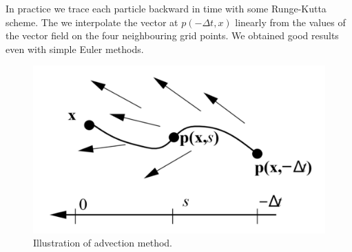 \documentclass[a4paper,10pt,oneside,final,german,openbib,pdftex,titlepage]{scrbook}
\begin{document}
In practice we trace each particle backward in time with some Runge-Kutta scheme. The we interpolate the vector at $p(-\Delta t,x)$ linearly from the values of the vector field on the four neighbouring grid points. We obtained good results even with simple Euler methods.
\begin{figure}[H]
 \centering
 \includegraphics[scale=0.40]{images/advection.png}
 \caption{Illustration of advection method.}
 \label{Advection}
\end{figure}
\end{document}
